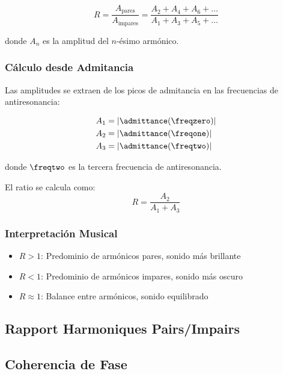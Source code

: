 \begin{equation}
R = \frac{A_{\text{pares}}}{A_{\text{impares}}} = \frac{A_2 + A_4 + A_6 + \ldots}{A_1 + A_3 + A_5 + \ldots}
\label{eq:harmonic_ratio}
\end{equation}

donde $A_n$ es la amplitud del $n$-ésimo armónico.

\subsubsection{Cálculo desde Admitancia}

Las amplitudes se extraen de los picos de admitancia en las frecuencias de antiresonancia:

\begin{align}
A_1 &= |\admittance(\freqzero)| \\
A_2 &= |\admittance(\freqone)| \\
A_3 &= |\admittance(\freqtwo)|
\end{align}

donde $\freqtwo$ es la tercera frecuencia de antiresonancia.

El ratio se calcula como:
\begin{equation}
R = \frac{A_2}{A_1 + A_3}
\end{equation}

\subsubsection{Interpretación Musical}

\begin{itemize}
    \item \textbf{$R > 1$}: Predominio de armónicos pares, sonido más brillante
    \item \textbf{$R < 1$}: Predominio de armónicos impares, sonido más oscuro
    \item \textbf{$R \approx 1$}: Balance entre armónicos, sonido equilibrado
\end{itemize}

\subsection{Rapport Harmoniques Pairs/Impairs}


\subsection{Coherencia de Fase}


